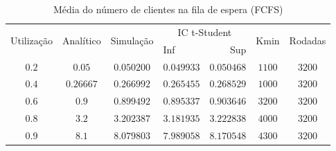 \documentclass[a4paper]{article}
\begin{document}
\begin{table}[h!]
    \centering
    \begin{tabular}{|c|c|c|lr|c|c|}\hline
        \multirow{2}{4.35em}{Utilização}
            & \multirow{2}{3.95em}{Analítico}
            & \multirow{2}{4.4em}{Simulação}
            & \multicolumn{2}{|c|}{IC t-Student}
            & \multirow{2}{2.4em}{Kmin}
            & \multirow{2}{3.75em}{Rodadas} \\
        &&& Inf & Sup &&\\\hline
        $ 0.2 $&$ 0.05 $&$ 0.050200 $&$ 0.049933 $&$ 0.050468 $&$
            1100 $&$ 3200 $\\\hline
        $ 0.4 $&$ 0.26667 $&$ 0.266992 $&$ 0.265455 $&$ 0.268529 $&$
            1000 $&$ 3200 $\\\hline
        $ 0.6 $&$ 0.9 $&$ 0.899492 $&$ 0.895337 $&$ 0.903646 $&$
            3200 $&$ 3200 $\\\hline
        $ 0.8 $&$ 3.2 $&$ 3.202387 $&$ 3.181935 $&$ 3.222838 $&$
            4000 $&$ 3200 $\\\hline
        $ 0.9 $&$ 8.1 $&$ 8.079803 $&$ 7.989058 $&$ 8.170548 $&$
            4300 $&$ 3200 $\\\hline
    \end{tabular}
    \caption{Média do número de clientes na fila de espera (FCFS)}
\end{table}
\end{document}

